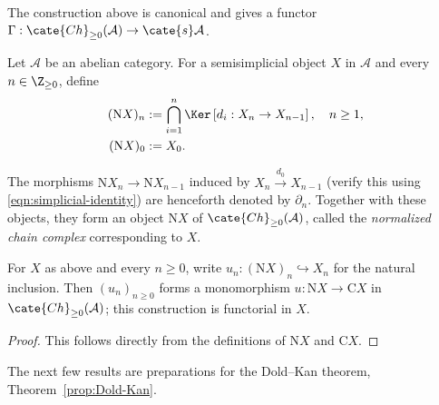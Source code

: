 The construction above is canonical and gives a functor
$\Gamma:\cate{Ch}_{\geq0}(\mathcal{A})\to\cate{s}\mathcal{A}$.

\begin{definition}\label{def:normalized-cplx}
	Let $\mathcal{A}$ be an abelian category. For a semisimplicial object $X$
	in $\mathcal{A}$ and every $n\in\Z_{\geq0}$, define
	\begin{align*}
		(\mathrm{N} X)_n & := \bigcap_{i=1}^n \Ker\left[ d_i: X_n \to X_{n-1} \right], \quad n \geq 1, \\
		(\mathrm{N} X)_0 & := X_0.
	\end{align*}

	The morphisms $\mathrm{N}X_n\to\mathrm{N}X_{n-1}$ induced by
	$X_n\xrightarrow{d_0}X_{n-1}$ (verify this using
	\eqref{eqn:simplicial-identity}) are henceforth denoted by $\partial_n$.
	Together with these objects, they form an object $\mathrm{N}X$ of
	$\cate{Ch}_{\geq0}(\mathcal{A})$, called the \emph{normalized chain
	complex} corresponding to $X$.
\end{definition}

\begin{proposition}\label{prop:Dold-Kan-u}
	For $X$ as above and every $n\geq0$, write
	$u_n:(\mathrm{N}X)_n\hookrightarrow X_n$ for the natural inclusion. Then
	$(u_n)_{n\geq0}$ forms a monomorphism
	$u:\mathrm{N}X\to\mathrm{C}X$ in
	$\cate{Ch}_{\geq0}(\mathcal{A})$; this construction is functorial in $X$.
\end{proposition}
\begin{proof}
	This follows directly from the definitions of $\mathrm{N}X$ and
	$\mathrm{C}X$.
\end{proof}

The next few results are preparations for the Dold--Kan theorem,
Theorem~\ref{prop:Dold-Kan}.

